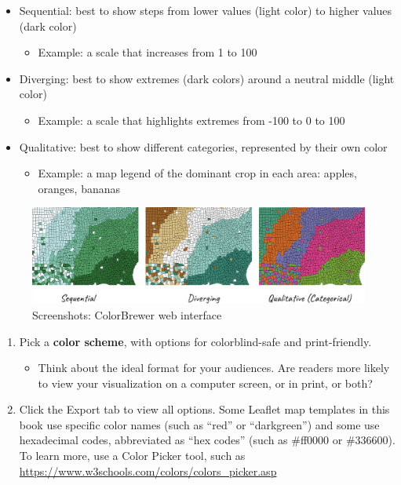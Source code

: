\documentclass[
  english,
]{book}
\providecommand{\tightlist}{%
  \setlength{\itemsep}{0pt}\setlength{\parskip}{0pt}}
\begin{document}
\begin{itemize}
\tightlist
\item
  Sequential: best to show steps from lower values (light color) to higher values (dark color)

  \begin{itemize}
  \tightlist
  \item
    Example: a scale that increases from 1 to 100
  \end{itemize}
\item
  Diverging: best to show extremes (dark colors) around a neutral middle (light color)

  \begin{itemize}
  \tightlist
  \item
    Example: a scale that highlights extremes from -100 to 0 to 100
  \end{itemize}
\item
  Qualitative: best to show different categories, represented by their own color

  \begin{itemize}
  \tightlist
  \item
    Example: a map legend of the dominant crop in each area: apples, oranges, bananas
  \end{itemize}
\end{itemize}

\begin{figure}
\centering
\includegraphics{images/06-map/Map - ColorBrewer - Schemes.png}
\caption{Screenshots: ColorBrewer web interface}
\end{figure}

\begin{enumerate}
\def\labelenumi{\arabic{enumi})}
\setcounter{enumi}{2}
\tightlist
\item
  Pick a \textbf{color scheme}, with options for colorblind-safe and print-friendly.

  \begin{itemize}
  \tightlist
  \item
    Think about the ideal format for your audiences. Are readers more likely to view your visualization on a computer screen, or in print, or both?
  \end{itemize}
\item
  Click the Export tab to view all options. Some Leaflet map templates in this book use specific color names (such as ``red'' or ``darkgreen'') and some use hexadecimal codes, abbreviated as ``hex codes'' (such as \#ff0000 or \#336600). To learn more, use a Color Picker tool, such as \url{https://www.w3schools.com/colors/colors_picker.asp}
\end{enumerate}
\end{document}
